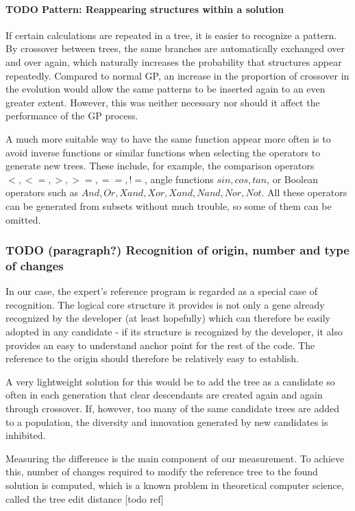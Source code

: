 \paragraph{TODO Pattern: Reappearing structures within a solution}
If certain calculations are repeated in a tree, it is easier to recognize a pattern. By crossover between trees, the same branches are automatically exchanged over and over again, which naturally increases the probability that structures appear repeatedly. Compared to normal GP, an increase in the proportion of crossover in the evolution would allow the same patterns to be inserted again to an even greater extent. However, this was neither necessary nor should it affect the performance of the GP process.

A much more suitable way to have the same function appear more often is to avoid inverse functions or similar functions when selecting the operators to generate new trees. These include, for example, the comparison operators $<, <=, >, >=, ==, !=$, angle functions $sin, cos, tan$, or Boolean operators such as $And, Or, Xand, Xor, Xand, Nand, Nor, Not$. All these operators can be generated from subsets without much trouble, so some of them can be omitted.


\subsubsection{TODO (paragraph?) Recognition of origin, number and type of changes}

In our case, the expert's reference program is regarded as a special case of recognition. The logical core structure it provides is not only a gene already recognized by the developer (at least hopefully) which can therefore be easily adopted in any candidate - if its structure is recognized by the developer, it also provides an easy to understand anchor point for the rest of the code. The reference to the origin should therefore be relatively easy to establish.

A very lightweight solution for this would be to add the tree as a candidate so often in each generation that clear descendants are created again and again through crossover. If, however, too many of the same candidate trees are added to a population, the diversity and innovation generated by new candidates is inhibited.

Measuring the difference is the main component of our measurement. To achieve this, number of changes required to modify the reference tree to the found solution is computed, which is a known problem in theoretical computer science, called the tree edit distance [todo ref]

